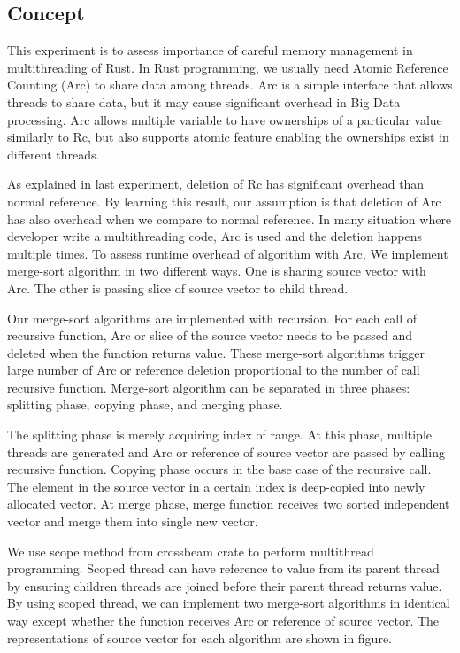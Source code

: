 \subsection{Concept}
This experiment is to assess importance of careful memory management in multithreading of Rust. 
In Rust programming, we usually need Atomic Reference Counting (Arc) to share data among threads. 
Arc is a simple interface that allows threads to share data, but it may cause significant overhead in Big Data processing.
Arc allows multiple variable to have ownerships of a particular value similarly to Rc, 
but also supports atomic feature enabling the ownerships exist in different threads. 

As explained in last experiment, deletion of Rc has significant overhead than normal reference. 
By learning this result, our assumption is that deletion of Arc has also overhead when we compare to normal reference. 
In many situation where developer write a multithreading code, Arc is used and the deletion happens multiple times. 
To assess runtime overhead of algorithm with Arc, We implement merge-sort algorithm in two different ways. 
One is sharing source vector with Arc. The other is passing slice of source vector to child thread. 

Our merge-sort algorithms are implemented with recursion. For each call of recursive function, 
Arc or slice of the source vector needs to be passed and deleted when the function returns value. 
These merge-sort algorithms trigger large number of Arc or reference deletion proportional to the number of call recursive function.
Merge-sort algorithm can be separated in three phases: splitting phase, copying phase, and merging phase. 

The splitting phase is merely acquiring index of range. At this phase, multiple threads are generated and Arc or reference of source vector are passed by calling recursive function. 
Copying phase occurs in the base case of the recursive call. The element in the source vector in a certain index is deep-copied into newly allocated vector.
At merge phase, merge function receives two sorted independent vector and merge them into single new vector.

We use scope method from crossbeam crate to perform multithread programming. 
Scoped thread can have reference to value from its parent thread by ensuring children threads are joined before their parent thread returns value. 
By using scoped thread, we can implement two merge-sort algorithms in identical way except whether the function receives Arc or reference of source vector.
The representations of source vector for each algorithm are shown in figure.

